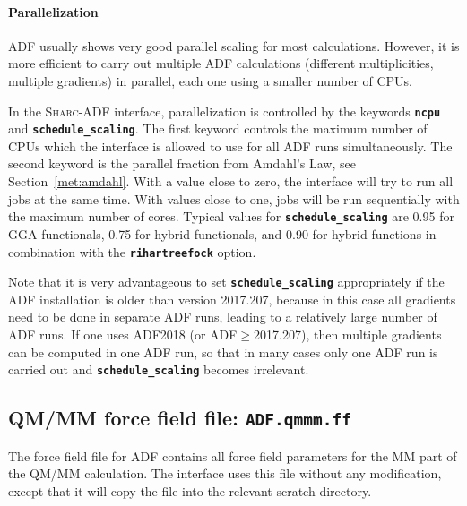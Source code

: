 \documentclass[a4paper,10pt,DIV=15,openany,twoside=false]{scrbook}
\newcommand{\sharc}{\textsc{Sharc}}
\newcommand{\ttt}[1]{\textbf{\texttt{#1}}}
\begin{document}
\paragraph{Parallelization}

ADF usually shows very good parallel scaling for most calculations.
However, it is more efficient to carry out multiple ADF calculations (different multiplicities, multiple gradients) in parallel, each one using a smaller number of CPUs.

In the \sharc-ADF interface, parallelization is controlled by the keywords \ttt{ncpu} and \ttt{schedule\_scaling}.
The first keyword controls the maximum number of CPUs which the interface is allowed to use for all ADF runs simultaneously.
The second keyword is the parallel fraction from Amdahl's Law, see Section~\ref{met:amdahl}.
With a value close to zero, the interface will try to run all jobs at the same time. With values close to one, jobs will be run sequentially with the maximum number of cores.
Typical values for \ttt{schedule\_scaling} are 0.95 for GGA functionals, 0.75 for hybrid functionals, and 0.90 for hybrid functions in combination with the \ttt{rihartreefock} option.

Note that it is very advantageous to set \ttt{schedule\_scaling} appropriately if the ADF installation is older than version 2017.207, because in this case all gradients need to be done in separate ADF runs, leading to a relatively large number of ADF runs.
If one uses ADF2018 (or ADF$\geq$2017.207), then multiple gradients can be computed in one ADF run, so that in many cases only one ADF run is carried out and \ttt{schedule\_scaling} becomes irrelevant.





\subsection{QM/MM force field file: \ttt{ADF.qmmm.ff}}

The force field file for ADF contains all force field parameters for the MM part of the QM/MM calculation.
The interface uses this file without any modification, except that it will copy the file into the relevant scratch directory.
\end{document}
